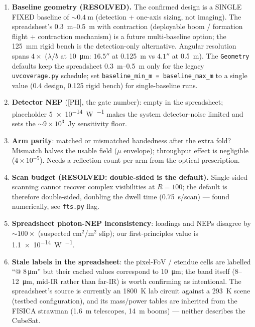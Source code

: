 \documentclass[11pt]{article}
\newcommand{\code}[1]{\texttt{\small #1}}
\newcommand{\file}[1]{\textcolor{plumdark}{\texttt{\small #1}}}
\begin{document}
\begin{enumerate}
\item \textbf{Baseline geometry (RESOLVED).} The confirmed design is a
SINGLE FIXED baseline of ${\sim}\SI{0.4}{\metre}$ (detection + one-axis
sizing, not imaging). The spreadsheet's \SIrange{0.3}{0.5}{\metre} with
contraction (deployable boom / formation flight + contraction mechanism)
is a future multi-baseline option; the \SI{125}{\milli\metre} rigid bench is
the detection-only alternative. Angular resolution spans $4\times$
($\lambda/b$ at \SI{10}{\micro\metre}: $16.5''$ at \SI{0.125}{\metre} vs
$4.1''$ at \SI{0.5}{\metre}). The \code{Geometry} defaults keep the
spreadsheet \SIrange{0.3}{0.5}{\metre} only for the legacy
\code{uvcoverage.py} schedule; set
\code{baseline\_min\_m = baseline\_max\_m} to a single value (0.4 design,
0.125 rigid bench) for single-baseline runs.
\item \textbf{Detector NEP} ([PH], the gate number): empty in the
spreadsheet; placeholder \SI{5e-14}{\watt\per\sqrt{\hertz}} makes the system
detector-noise limited and sets the $\sim 9\times10^3$~Jy sensitivity floor.
\item \textbf{Arm parity}: matched or mismatched handedness after the extra
fold? Mismatch halves the usable field ($\mu$ envelope); throughput effect
is negligible ($4\times10^{-5}$). Needs a reflection count per arm from the
optical prescription.
\item \textbf{Scan budget (RESOLVED: double-sided is the default).}
Single-sided scanning cannot recover complex visibilities at $R=100$; the
default is therefore double-sided, doubling the dwell time
(\SI{0.75}{\second}/scan) --- found numerically, see \file{fts.py} flag.
\item \textbf{Spreadsheet photon-NEP inconsistency}: loadings and NEPs
disagree by $\sim 100\times$ (suspected cm$^2$/m$^2$ slip); our
first-principles value is \SI{1.1e-14}{\watt\per\sqrt{\hertz}}.
\item \textbf{Stale labels in the spreadsheet}: the pixel-FoV / etendue
cells are labelled ``@ 8\,\si{\micro\metre}'' but their cached values
correspond to \SI{10}{\micro\metre}; the band itself (8--12~\si{\micro\metre},
mid-IR rather than far-IR) is worth confirming as intentional. The
spreadsheet's source is currently an \SI{1800}{\kelvin} lab circuit against
a \SI{293}{\kelvin} scene (testbed configuration), and its mass/power tables
are inherited from the FISICA strawman (1.6~m telescopes, 14~m booms) ---
neither describes the CubeSat.
\end{enumerate}
\end{document}
